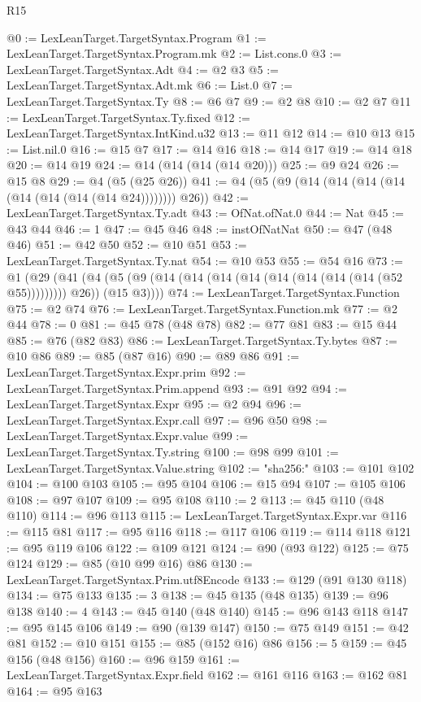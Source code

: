 \begin{lexlean}{R15}
\begin{coremodule}
@0 := LexLeanTarget.TargetSyntax.Program
@1 := LexLeanTarget.TargetSyntax.Program.mk
@2 := List.cons.{0}
@3 := LexLeanTarget.TargetSyntax.Adt
@4 := @2 @3
@5 := LexLeanTarget.TargetSyntax.Adt.mk
@6 := List.{0}
@7 := LexLeanTarget.TargetSyntax.Ty
@8 := @6 @7
@9 := @2 @8
@10 := @2 @7
@11 := LexLeanTarget.TargetSyntax.Ty.fixed
@12 := LexLeanTarget.TargetSyntax.IntKind.u32
@13 := @11 @12
@14 := @10 @13
@15 := List.nil.{0}
@16 := @15 @7
@17 := @14 @16
@18 := @14 @17
@19 := @14 @18
@20 := @14 @19
@24 := @14 (@14 (@14 (@14 @20)))
@25 := @9 @24
@26 := @15 @8
@29 := @4 (@5 (@25 @26))
@41 := @4 (@5 (@9 (@14 (@14 (@14 (@14 (@14 (@14 (@14 (@14 @24)))))))) @26))
@42 := LexLeanTarget.TargetSyntax.Ty.adt
@43 := OfNat.ofNat.{0}
@44 := Nat
@45 := @43 @44
@46 := 1
@47 := @45 @46
@48 := instOfNatNat
@50 := @47 (@48 @46)
@51 := @42 @50
@52 := @10 @51
@53 := LexLeanTarget.TargetSyntax.Ty.nat
@54 := @10 @53
@55 := @54 @16
@73 := @1
    (@29
      (@41 (@4 (@5 (@9 (@14 (@14 (@14 (@14 (@14 (@14 (@14 (@14 (@52 @55))))))))) @26)) (@15 @3))))
@74 := LexLeanTarget.TargetSyntax.Function
@75 := @2 @74
@76 := LexLeanTarget.TargetSyntax.Function.mk
@77 := @2 @44
@78 := 0
@81 := @45 @78 (@48 @78)
@82 := @77 @81
@83 := @15 @44
@85 := @76 (@82 @83)
@86 := LexLeanTarget.TargetSyntax.Ty.bytes
@87 := @10 @86
@89 := @85 (@87 @16)
@90 := @89 @86
@91 := LexLeanTarget.TargetSyntax.Expr.prim
@92 := LexLeanTarget.TargetSyntax.Prim.append
@93 := @91 @92
@94 := LexLeanTarget.TargetSyntax.Expr
@95 := @2 @94
@96 := LexLeanTarget.TargetSyntax.Expr.call
@97 := @96 @50
@98 := LexLeanTarget.TargetSyntax.Expr.value
@99 := LexLeanTarget.TargetSyntax.Ty.string
@100 := @98 @99
@101 := LexLeanTarget.TargetSyntax.Value.string
@102 := "sha256:"
@103 := @101 @102
@104 := @100 @103
@105 := @95 @104
@106 := @15 @94
@107 := @105 @106
@108 := @97 @107
@109 := @95 @108
@110 := 2
@113 := @45 @110 (@48 @110)
@114 := @96 @113
@115 := LexLeanTarget.TargetSyntax.Expr.var
@116 := @115 @81
@117 := @95 @116
@118 := @117 @106
@119 := @114 @118
@121 := @95 @119 @106
@122 := @109 @121
@124 := @90 (@93 @122)
@125 := @75 @124
@129 := @85 (@10 @99 @16) @86
@130 := LexLeanTarget.TargetSyntax.Prim.utf8Encode
@133 := @129 (@91 @130 @118)
@134 := @75 @133
@135 := 3
@138 := @45 @135 (@48 @135)
@139 := @96 @138
@140 := 4
@143 := @45 @140 (@48 @140)
@145 := @96 @143 @118
@147 := @95 @145 @106
@149 := @90 (@139 @147)
@150 := @75 @149
@151 := @42 @81
@152 := @10 @151
@155 := @85 (@152 @16) @86
@156 := 5
@159 := @45 @156 (@48 @156)
@160 := @96 @159
@161 := LexLeanTarget.TargetSyntax.Expr.field
@162 := @161 @116
@163 := @162 @81
@164 := @95 @163

\end{coremodule}
\end{lexlean}
